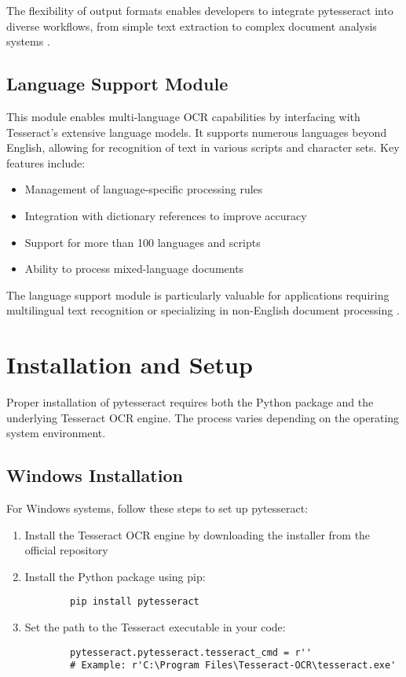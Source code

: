 The flexibility of output formats enables developers to integrate pytesseract into diverse workflows, from simple text extraction to complex document analysis systems \cite{DataCamp:2024}.

\subsection{Language Support Module}
\label{subsec:language_support}

This module enables multi-language OCR capabilities by interfacing with Tesseract's extensive language models. It supports numerous languages beyond English, allowing for recognition of text in various scripts and character sets. Key features include:

\begin{itemize}
	\item Management of language-specific processing rules
	\item Integration with dictionary references to improve accuracy
	\item Support for more than 100 languages and scripts
	\item Ability to process mixed-language documents
\end{itemize}

The language support module is particularly valuable for applications requiring multilingual text recognition or specializing in non-English document processing \cite{Anitha:2024}.

\section{Installation and Setup}
\label{sec:installation}

Proper installation of pytesseract requires both the Python package and the underlying Tesseract OCR engine. The process varies depending on the operating system environment.

\subsection{Windows Installation}
\label{subsec:windows_install}

For Windows systems, follow these steps to set up pytesseract:

\begin{enumerate}
	\item Install the Tesseract OCR engine by downloading the installer from the official repository
	\item Install the Python package using pip:
	\begin{verbatim}
		pip install pytesseract
	\end{verbatim}
	\item Set the path to the Tesseract executable in your code:
	\begin{verbatim}
		pytesseract.pytesseract.tesseract_cmd = r''
		# Example: r'C:\Program Files\Tesseract-OCR\tesseract.exe'
	\end{verbatim}
\end{enumerate}

